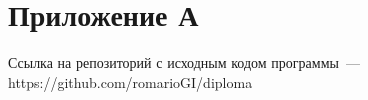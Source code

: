 \section*{Приложение А}

	Ссылка на репозиторий с исходным кодом программы~---\\ https://github.com/romarioGI/diploma	